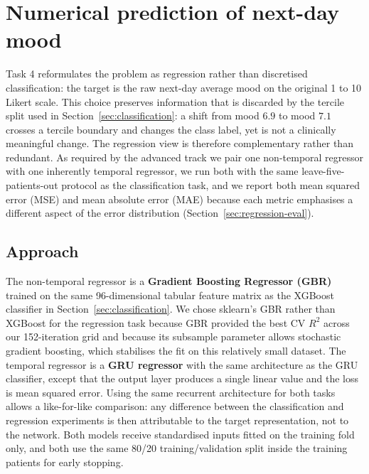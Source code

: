 
\section{Numerical prediction of next-day mood}\label{sec:regression}

Task 4 reformulates the problem as regression rather than discretised classification: the target is the raw next-day average mood on the original 1 to 10 Likert scale. This choice preserves information that is discarded by the tercile split used in Section~\ref{sec:classification}: a shift from mood $6.9$ to mood $7.1$ crosses a tercile boundary and changes the class label, yet is not a clinically meaningful change. The regression view is therefore complementary rather than redundant. As required by the advanced track we pair one non-temporal regressor with one inherently temporal regressor, we run both with the same leave-five-patients-out protocol as the classification task, and we report both mean squared error (MSE) and mean absolute error (MAE) because each metric emphasises a different aspect of the error distribution (Section~\ref{sec:regression-eval}).

\subsection{Approach}\label{sec:regression-approach}

The non-temporal regressor is a \textbf{Gradient Boosting Regressor (GBR)} \cite{friedman2001greedy} trained on the same 96-dimensional tabular feature matrix as the XGBoost classifier in Section~\ref{sec:classification}. We chose sklearn's GBR rather than XGBoost for the regression task because GBR provided the best CV $R^2$ across our 152-iteration grid and because its subsample parameter allows stochastic gradient boosting, which stabilises the fit on this relatively small dataset. The temporal regressor is a \textbf{GRU regressor} with the same architecture as the GRU classifier, except that the output layer produces a single linear value and the loss is mean squared error. Using the same recurrent architecture for both tasks allows a like-for-like comparison: any difference between the classification and regression experiments is then attributable to the target representation, not to the network. Both models receive standardised inputs fitted on the training fold only, and both use the same 80/20 training/validation split inside the training patients for early stopping.

